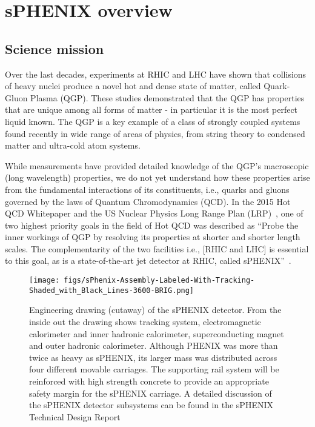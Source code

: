 \chapter{sPHENIX overview}
\label{chap:introduction}
\section{Science mission}
Over the last decades, experiments at RHIC and LHC have shown that collisions of heavy nuclei produce a novel hot and dense state of matter, called Quark-Gluon Plasma (QGP). These studies demonstrated that the QGP has properties that are unique among all forms of matter - in particular it is the most perfect liquid known. The QGP is a key example of a class of strongly coupled systems found recently in wide range of areas of physics, from string theory to condensed matter and ultra-cold atom systems.

While measurements have provided detailed knowledge of the QGP's macroscopic (long wavelength) properties, we do not yet understand how these properties arise from the fundamental interactions of its constituents, i.e., quarks and gluons governed by the laws of Quantum Chromodynamics (QCD).  In the 2015 Hot QCD Whitepaper and the US Nuclear Physics Long Range Plan (LRP)~\cite{Geesaman:2015fha}, one of two highest  priority goals in the field of Hot QCD was described as ``Probe the inner workings of QGP by resolving its properties at shorter and shorter length scales. The complementarity of the two facilities i.e., [RHIC and LHC] is essential to this goal, as is a state-of-the-art jet detector at RHIC, called sPHENIX''~\cite{Geesaman:2015fha}.

\begin{figure}[htpb]
\begin{center}
\texttt{[image: figs/sPhenix-Assembly-Labeled-With-Tracking-Shaded\_with\_Black\_Lines-3600-BRIG.png]}
\end{center}
\vspace{-0.5cm}
\caption{\label{fig:sPHENIX} Engineering drawing (cutaway) of the
  sPHENIX detector. From the inside out the drawing shows tracking
  system, electromagnetic calorimeter and inner hadronic calorimeter,
  superconducting magnet and outer hadronic calorimeter.  Although
  PHENIX was more than twice as heavy as sPHENIX, its larger mass was
  distributed across four different movable carriages.  The supporting
  rail system will be reinforced with high strength concrete to
  provide an appropriate safety margin for the sPHENIX carriage. A
  detailed discussion of the sPHENIX detector subsystems can be found
  in the sPHENIX Technical Design Report~\cite{sPHENIX:2019tdr}}
\end{figure}

